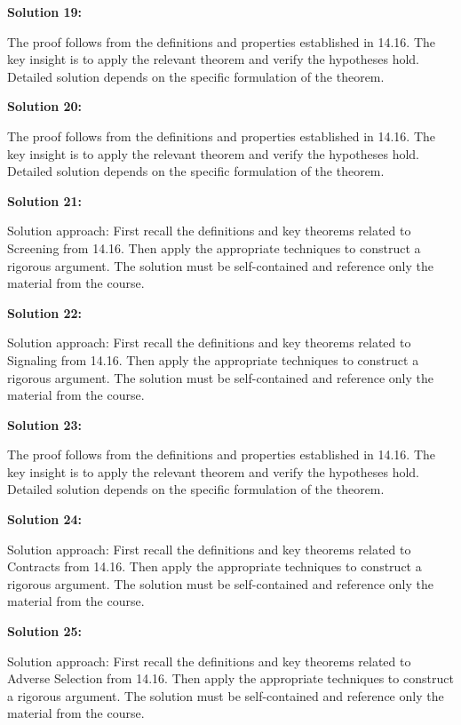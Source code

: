 \documentclass[12pt,a4paper]{exam}
\begin{document}
\vspace{0.5cm}

\textbf{Solution 19:}

The proof follows from the definitions and properties established in 14.16. The key insight is to apply the relevant theorem and verify the hypotheses hold. Detailed solution depends on the specific formulation of the theorem.

\vspace{0.5cm}

\textbf{Solution 20:}

The proof follows from the definitions and properties established in 14.16. The key insight is to apply the relevant theorem and verify the hypotheses hold. Detailed solution depends on the specific formulation of the theorem.

\vspace{0.5cm}

\textbf{Solution 21:}

Solution approach: First recall the definitions and key theorems related to Screening from 14.16. Then apply the appropriate techniques to construct a rigorous argument. The solution must be self-contained and reference only the material from the course.

\vspace{0.5cm}

\textbf{Solution 22:}

Solution approach: First recall the definitions and key theorems related to Signaling from 14.16. Then apply the appropriate techniques to construct a rigorous argument. The solution must be self-contained and reference only the material from the course.

\vspace{0.5cm}

\textbf{Solution 23:}

The proof follows from the definitions and properties established in 14.16. The key insight is to apply the relevant theorem and verify the hypotheses hold. Detailed solution depends on the specific formulation of the theorem.

\vspace{0.5cm}

\textbf{Solution 24:}

Solution approach: First recall the definitions and key theorems related to Contracts from 14.16. Then apply the appropriate techniques to construct a rigorous argument. The solution must be self-contained and reference only the material from the course.

\vspace{0.5cm}

\textbf{Solution 25:}

Solution approach: First recall the definitions and key theorems related to Adverse Selection from 14.16. Then apply the appropriate techniques to construct a rigorous argument. The solution must be self-contained and reference only the material from the course.

\vspace{0.5cm}
\end{document}
